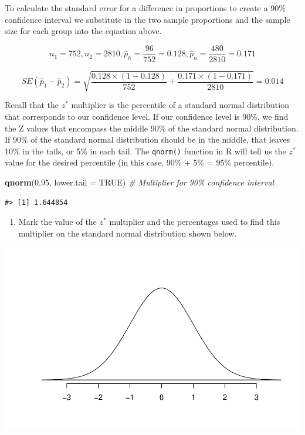\documentclass[
]{report}
\newenvironment{Shaded}{\begin{snugshade}}{\end{snugshade}}
\newcommand{\AttributeTok}[1]{\textcolor[rgb]{0.13,0.29,0.53}{#1}}
\newcommand{\CommentTok}[1]{\textcolor[rgb]{0.56,0.35,0.01}{\textit{#1}}}
\newcommand{\ConstantTok}[1]{\textcolor[rgb]{0.56,0.35,0.01}{#1}}
\newcommand{\FloatTok}[1]{\textcolor[rgb]{0.00,0.00,0.81}{#1}}
\newcommand{\FunctionTok}[1]{\textcolor[rgb]{0.13,0.29,0.53}{\textbf{#1}}}
\newcommand{\NormalTok}[1]{#1}
\providecommand{\tightlist}{%
  \setlength{\itemsep}{0pt}\setlength{\parskip}{0pt}}
\begin{document}
To calculate the standard error for a difference in proportions to create a 90\% confidence interval we substitute in the two sample proportions and the sample size for each group into the equation above.

\[n_1 = 752, n_2 = 2810, \hat{p}_h = \frac{96}{752} = 0.128, \hat{p}_n = \frac{480}{2810} = 0.171\]

\[SE(\hat{p}_1-\hat{p}_2) = \sqrt{\frac{0.128\times (1-0.128)}{752}+\frac{0.171\times (1-0.171)}{2810}} = 0.014\]

Recall that the \(z^*\) multiplier is the percentile of a standard normal distribution that corresponds to our confidence level. If our confidence level is 90\%, we find the Z values that encompass the middle 90\% of the standard normal distribution. If 90\% of the standard normal distribution should be in the middle, that leaves 10\% in the tails, or 5\% in each tail. The \texttt{qnorm()} function in R will tell us the \(z^*\) value for the desired percentile (in this case, 90\% + 5\% = 95\% percentile).

\begin{Shaded}
\begin{Highlighting}[]
\FunctionTok{qnorm}\NormalTok{(}\FloatTok{0.95}\NormalTok{, }\AttributeTok{lower.tail =} \ConstantTok{TRUE}\NormalTok{) }\CommentTok{\# Multiplier for 90\% confidence interval}
\end{Highlighting}
\end{Shaded}

\begin{verbatim}
#> [1] 1.644854
\end{verbatim}

\begin{enumerate}
\def\labelenumi{\arabic{enumi}.}
\setcounter{enumi}{3}
\tightlist
\item
  Mark the value of the \(z^*\) multiplier and the percentages used to find this multiplier on the standard normal distribution shown below.
\end{enumerate}

\begin{center}\includegraphics[width=0.5\linewidth]{09-OCA08-inference-2cat_CI-theory_files/figure-latex/standNormc-1} \end{center}
\end{document}
